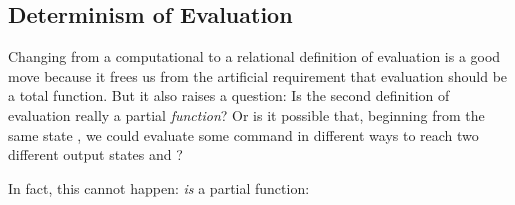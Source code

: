 \documentclass[12pt]{report}
\begin{document}
\subsection{Determinism of Evaluation}



 Changing from a computational to a relational definition of
    evaluation is a good move because it frees us from the artificial
    requirement that evaluation should be a total function.  But it
    also raises a question: Is the second definition of evaluation
    really a partial \textit{function}?  Or is it possible that, beginning from
    the same state , we could evaluate some command  in
    different ways to reach two different output states  and
    ?


    In fact, this cannot happen:  \textit{is} a partial function: 
\end{document}
